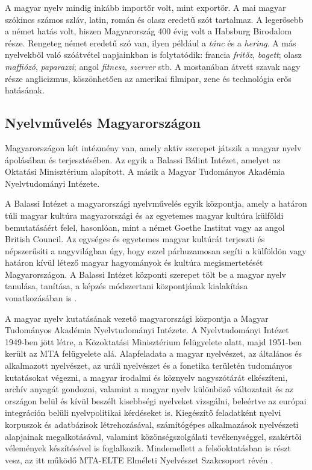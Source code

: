 \begin{multicols}{2}
A magyar nyelv mindig inkább importőr volt, mint exportőr. A mai magyar szó\-kincs számos szláv, latin, román és olasz eredetű szót tartalmaz. A legerősebb a német hatás volt, hiszen Magyarország 400 évig volt a Habsburg Birodalom része. Rengeteg német eredetű szó van, ilyen például a \textit{tánc} és a \textit{hering}. A más nyelvekből való szóátvétel napjainkban is folytatódik: francia \textit{fritőz}, \textit{bagett}; olasz \textit{maffiózó}, \textit{paparazzi}; angol \textit{fitnesz}, \textit{szerver} stb. A mostanában átvett szavak nagy része anglicizmus, köszönhetően az amerikai filmipar, zene és technológia erős hatásának.

\subsection{Nyelvművelés Magyarországon}

Magyarországon két intézmény van, amely aktív szerepet játszik a magyar nyelv ápolásában és terjesztésében. Az egyik a Balassi Bálint Intézet, amelyet az Oktatási Minisztérium alapított. A másik a Magyar Tudományos Akadémia Nyelvtudományi Intézete.

A Balassi Intézet a magyarországi nyelv\-mű\-ve\-lés egyik központja, amely a határon túli magyar kultúra magyarországi és az egyetemes magyar kultúra külföldi bemutatásáért felel, hasonlóan, mint a német Goethe Institut vagy az angol British Council. Az egységes és egyetemes ma\-gyar kultúrát terjeszti és népszerűsíti a nagyvilágban úgy, hogy ezzel pár\-hu\-za\-mo\-san segíti a külföldön vagy határon kívül létező magyar hagyományok és kultúra megismertetését Magyarországon. A Ba\-las\-si Intézet központi szerepet tölt be a magyar nyelv tanulása, tanítása, a képzés módszertani központjának kialakítása vo\-nat\-ko\-zá\-sá\-ban is \cite{bbi}. 


A magyar nyelv kutatásának vezető ma\-gyar\-or\-szá\-gi központja a Magyar Tu\-do\-má\-nyos Akadémia Nyelvtudományi Intézete. A Nyelvtudományi Intézet 1949-ben jött létre, a Közoktatási Minisztérium felügyelete alatt, majd 1951-ben került az MTA felügyelete alá. Alapfeladata a magyar nyelvészet, az általános és alkalmazott nyelvészet, az uráli nyelvészet és a fonetika területén tudományos kutatásokat végezni, a magyar irodalmi és köznyelv nagyszótárát elkészíteni, archív anyagát gondozni, valamint a magyar nyelv különböző változatait és az országon belül és kívül beszélt kisebbségi nyelveket vizsgálni, beleértve az európai integráción belüli nyelvpolitikai kérdéseket is. Kiegészítő feladatként nyelvi korpuszok és adatbázisok létrehozásával, számítógépes alkalmazások nyelvészeti alapjainak meg\-al\-ko\-tá\-sá\-val, valamint közönségszolgálati tevékenységgel, szakértői vélemények ké\-szí\-té\-sé\-vel is foglalkozik. Mindemellett a felsőoktatásban is részt vesz, az itt működő MTA-ELTE Elméleti Nyelvészet Szakcsoport révén \cite{nytud}.


\end{multicols}
